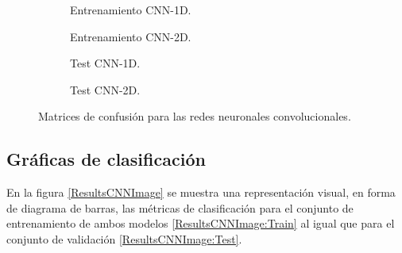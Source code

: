     \begin{figure}[H]
      \centering
      \begin{subfigure}{0.4\textwidth}
          
          \caption{Entrenamiento CNN-1D.}
          \label{ConfusionMatrixCNNImages:Train1D}
      \end{subfigure}
      \hspace{1mm}
      \begin{subfigure}{0.4\textwidth}
          
          \caption{Entrenamiento CNN-2D.} 
          \label{ConfusionMatrixCNNImages:Train2D}
      \end{subfigure}
      \vspace*{2mm}
      \begin{subfigure}{0.4\textwidth}
          
          \caption{Test CNN-1D.}
          \label{ConfusionMatrixCNNImages:Test1D}
      \end{subfigure}
      \hspace{1em}
      \begin{subfigure}{0.4\textwidth}
          
          \caption{Test CNN-2D.} 
          \label{ConfusionMatrixCNNImages:Test2D}
      \end{subfigure}
      \caption{Matrices de confusión para las redes neuronales convolucionales.}
      \label{ConfusionMatrixCNNImages}
    \end{figure}

\clearpage

  \subsection{Gráficas de clasificación}

    En la figura \eqref{ResultsCNNImage} se muestra una representación visual, en forma de diagrama de barras, las métricas de clasificación para el conjunto de entrenamiento de ambos modelos \eqref{ResultsCNNImage:Train} al igual que para el conjunto de validación \eqref{ResultsCNNImage:Test}.


